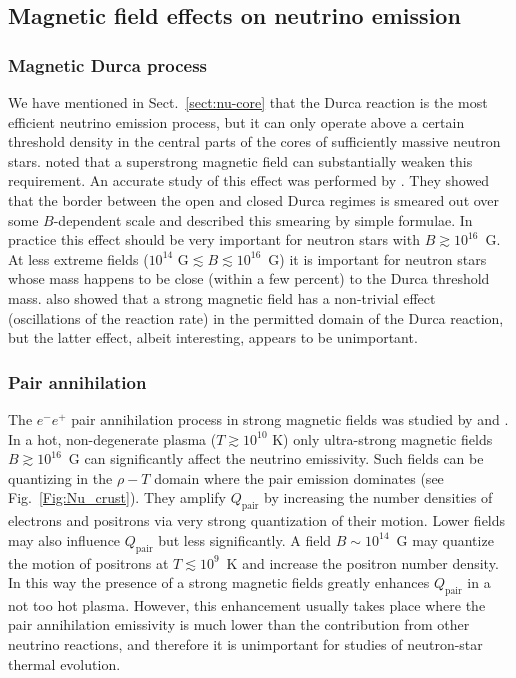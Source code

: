 \documentclass[smallextended]{svjour3}       %
\begin{document}
\subsection{Magnetic field effects on neutrino emission}
\label{sect:numag}

\subsubsection{Magnetic Durca process} 

We have mentioned in Sect.~\ref{sect:nu-core} that the Durca
reaction is the most efficient neutrino emission process,
but it can only operate above a certain threshold density in
the central parts of the cores of sufficiently massive
neutron stars.  \citet{LeinsonPerez98} noted that a
superstrong magnetic field can substantially weaken this
requirement. An accurate study of this effect was performed
by \citet{BaikoYakovlev99}. They showed that the border
between the open and closed Durca regimes is smeared out
over some $B$-dependent scale and described this smearing by
simple formulae. In practice this effect should be very
important for neutron stars with $B\gtrsim10^{16}$~G. At
less extreme fields ($10^{14}\mbox{~G}\lesssim B \lesssim
10^{16}$~G) it is important for neutron stars whose mass
happens to be close (within a few percent) to the Durca
threshold mass. \citet{BaikoYakovlev99} also showed that a
strong magnetic field has a non-trivial effect (oscillations
of the reaction rate) in the permitted domain of the Durca
reaction, but the latter effect, albeit interesting, appears
to be unimportant.

\subsubsection{Pair annihilation}

 The $e^-e^+$ pair annihilation process in strong magnetic fields 
was studied by \citet{Kaminker-ea92} and \citet{KaminkerYakovlev94}. 
In a hot, non-degenerate plasma ($T \gtrsim 10^{10}$ K) only
ultra-strong magnetic fields $B\gtrsim10^{16}$~G can
significantly affect the neutrino emissivity. Such fields
can be quantizing in the $\rho-T$ domain where the pair
emission dominates (see Fig.~\ref{Fig:Nu_crust}). They
amplify $Q_\mathrm{pair}$ by increasing the number densities
of electrons and positrons via very strong quantization of
their motion. Lower fields may also influence
$Q_\mathrm{pair}$ but less significantly. A field $B \sim
10^{14}$~G may quantize the motion of positrons at $T
\lesssim 10^9$~K and increase the positron number density.
In this way the presence of a strong magnetic fields greatly enhances
$Q_\mathrm{pair}$ in a not too hot plasma. However, this
enhancement usually takes place where the pair annihilation
emissivity is much lower than the contribution from other neutrino
reactions, and therefore it is unimportant for studies of
neutron-star thermal evolution.
\end{document}
